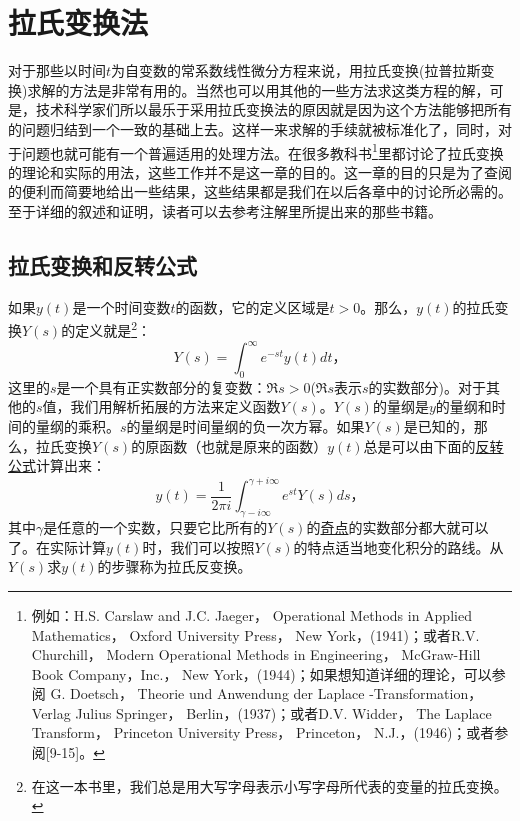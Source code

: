 
\chapter{拉氏变换法}

对于那些以时间$t$为自变数的常系数线性微分方程来说，用拉氏变换(拉普拉斯变换)求解的方法是非常有用的。当然也可以用其他的一些方法求这类方程的解，可是，技术科学家们所以最乐于采用拉氏变换法的原因就是因为这个方法能够把所有的问题归结到一个一致的基础上去。这样一来求解的手续就被标准化了，同时，对于问题也就可能有一个普遍适用的处理方法。在很多教科书\footnote{例如：H.S. Carslaw and J.C. Jaeger， Operational Methods in Applied Mathematics， Oxford University Press， New York，(1941)；或者R.V. Churchill， Modern Operational Methods in Engineering， McGraw-Hill Book Company，Inc.， New York，(1944)；如果想知道详细的理论，可以参阅 G. Doetsch， Theorie und Anwendung der Laplace -Transformation， Verlag Julius Springer， Berlin，(1937)；或者D.V. Widder， The Laplace Transform， Princeton University Press， Princeton， N.J.，(1946)；或者参阅[9-15]。}里都讨论了拉氏变换的理论和实际的用法，这些工作并不是这一章的目的。这一章的目的只是为了查阅的便利而简要地给出一些结果，这些结果都是我们在以后各章中的讨论所必需的。至于详细的叙述和证明，读者可以去参考注解里所提出来的那些书籍。

\section{拉氏变换和反转公式}

如果$y(t)$是一个时间变数$t$的函数，它的定义区域是$t>0$。那么，$y(t)$的拉氏变换$Y(s)$的定义就是\footnote{在这一本书里，我们总是用大写字母表示小写字母所代表的变量的拉氏变换。}：
\begin{equation}
Y(s)=\int_0^{\infty}e^{-st}y(t)dt，
\end{equation}
这里的$s$是一个具有正实数部分的复变数：$\mathfrak{R}s>0$($\mathfrak{R}s$表示$s$的实数部分)。对于其他的$s$值，我们用解析拓展的方法来定义函数$Y(s)$。$Y(s)$的量纲是$y$的量纲和时间的量纲的乘积。$s$的量纲是时间量纲的负一次方幂。如果$Y(s)$是已知的，那么，拉氏变换$Y(s)$的原函数（也就是原来的函数）$y(t)$总是可以由下面的\underline{反转公式}计算出来：
\begin{equation}\label{eq:inversion_formula}
y(t)=\frac{1}{2\pi i}\int _{\gamma -i\infty}^{\gamma + i\infty}e^{st}Y(s)ds，
\end{equation}
其中$\gamma$是任意的一个实数，只要它比所有的$Y(s)$的\underline{奇点}的实数部分都大就可以了。在实际计算$y(t)$时，我们可以按照$Y(s)$的特点适当地变化积分的路线。从$Y(s)$求$y(t)$的步骤称为拉氏反变换。

